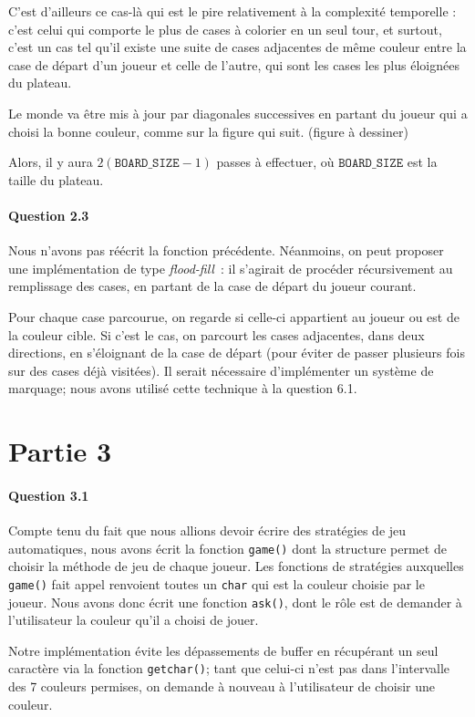\documentclass[a4paper]{article}
\newcommand{\boardsize}{\ensuremath{\mathtt{BOARD\_SIZE}}}
\begin{document}
C'est d'ailleurs ce cas-là qui est le pire relativement à la complexité 
temporelle : c'est celui qui comporte le plus de cases à colorier en un seul 
tour, et surtout, c'est un cas tel qu'il existe une suite de cases adjacentes 
de même couleur entre la case de départ d'un joueur et celle de l'autre, qui 
sont les cases les plus éloignées du plateau.

Le monde va être mis à jour par diagonales successives en partant du joueur qui 
a choisi la bonne couleur, comme sur la figure qui suit. (figure à dessiner)

Alors, il y aura $2(\boardsize-1)$ passes à effectuer, où \boardsize{} est la 
taille du plateau. 

    \paragraph{Question 2.3}
    Nous n'avons pas réécrit la fonction précédente. Néanmoins, on peut 
proposer une implémentation de type \emph{flood-fill}~: il s'agirait de 
procéder récursivement au remplissage des cases, en partant de la case de 
départ du joueur courant.

Pour chaque case parcourue, on regarde si celle-ci appartient au joueur ou est 
de la couleur cible. Si c'est le cas, on parcourt les cases adjacentes, dans 
deux directions, en s'éloignant de la case de départ (pour éviter de passer 
plusieurs fois sur des cases déjà visitées). Il serait nécessaire d'implémenter 
un système de marquage; nous avons utilisé cette technique à la question 6.1.

    \section{Partie 3}
    \paragraph{Question 3.1} Compte tenu du fait que nous allions devoir 
écrire des stratégies de jeu automatiques, nous avons écrit la fonction 
\texttt{game()} dont la structure permet de choisir la méthode de jeu de chaque 
joueur. Les fonctions de stratégies auxquelles \texttt{game()} fait appel 
renvoient toutes un \texttt{char} qui est la couleur choisie par le joueur.
Nous avons donc écrit une fonction \texttt{ask()}, dont le rôle est de demander 
à l'utilisateur la couleur qu'il a choisi de jouer. 

Notre implémentation évite les dépassements de buffer en récupérant un seul 
caractère via la fonction \texttt{getchar()}; tant que celui-ci n'est pas dans 
l'intervalle des 7 couleurs permises, on demande à nouveau à l'utilisateur de 
choisir une couleur.
\end{document}
